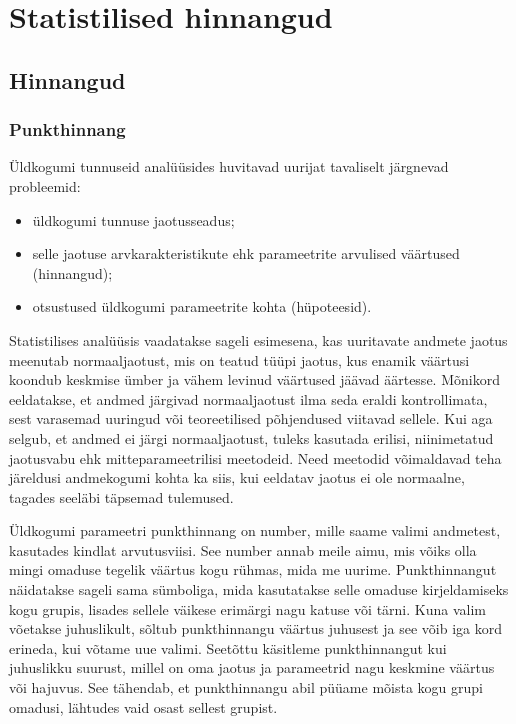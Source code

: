 \documentclass[
]{book}
\providecommand{\tightlist}{%
  \setlength{\itemsep}{0pt}\setlength{\parskip}{0pt}}
\begin{document}
\chapter{Statistilised hinnangud}\label{statistilised-hinnangud}

\section{Hinnangud}\label{hinnangud}

\subsection{Punkthinnang}\label{punkthinnang}

Üldkogumi tunnuseid analüüsides huvitavad uurijat tavaliselt järgnevad probleemid:

\begin{itemize}
\tightlist
\item
  üldkogumi tunnuse jaotusseadus;
\item
  selle jaotuse arvkarakteristikute ehk parameetrite arvulised väärtused (hinnangud);
\item
  otsustused üldkogumi parameetrite kohta (hüpoteesid).
\end{itemize}

Statistilises analüüsis vaadatakse sageli esimesena, kas uuritavate andmete jaotus meenutab normaaljaotust, mis on teatud tüüpi jaotus, kus enamik väärtusi koondub keskmise ümber ja vähem levinud väärtused jäävad äärtesse. Mõnikord eeldatakse, et andmed järgivad normaaljaotust ilma seda eraldi kontrollimata, sest varasemad uuringud või teoreetilised põhjendused viitavad sellele. Kui aga selgub, et andmed ei järgi normaaljaotust, tuleks kasutada erilisi, niinimetatud jaotusvabu ehk mitteparameetrilisi meetodeid. Need meetodid võimaldavad teha järeldusi andmekogumi kohta ka siis, kui eeldatav jaotus ei ole normaalne, tagades seeläbi täpsemad tulemused.

Üldkogumi parameetri punkthinnang on number, mille saame valimi andmetest, kasutades kindlat arvutusviisi. See number annab meile aimu, mis võiks olla mingi omaduse tegelik väärtus kogu rühmas, mida me uurime. Punkthinnangut näidatakse sageli sama sümboliga, mida kasutatakse selle omaduse kirjeldamiseks kogu grupis, lisades sellele väikese erimärgi nagu katuse või tärni. Kuna valim võetakse juhuslikult, sõltub punkthinnangu väärtus juhusest ja see võib iga kord erineda, kui võtame uue valimi. Seetõttu käsitleme punkthinnangut kui juhuslikku suurust, millel on oma jaotus ja parameetrid nagu keskmine väärtus või hajuvus. See tähendab, et punkthinnangu abil püüame mõista kogu grupi omadusi, lähtudes vaid osast sellest grupist.
\end{document}
